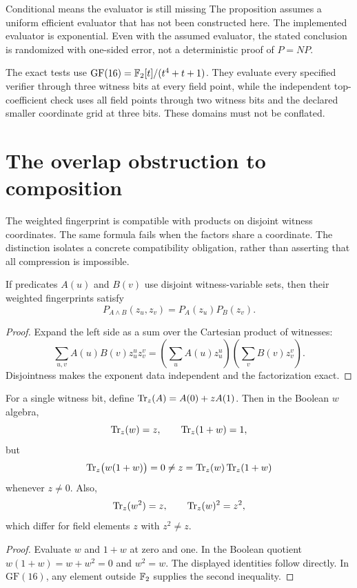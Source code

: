 \begin{circuitscopebox}{Conditional means the evaluator is still missing}
The proposition assumes a uniform efficient evaluator that has not been constructed here. The implemented evaluator is exponential. Even with the assumed evaluator, the stated conclusion is randomized with one-sided error, not a deterministic proof of $P=NP$.
\end{circuitscopebox}

The exact tests use $\mathrm{GF}(16)=\mathbb F_2[t]/(t^4+t+1)$. They evaluate every specified verifier through three witness bits at every field point, while the independent top-coefficient check uses all field points through two witness bits and the declared smaller coordinate grid at three bits. These domains must not be conflated.

\chapter{The overlap obstruction to composition}
\label{c:ch:overlap}
The weighted fingerprint is compatible with products on disjoint witness coordinates. The same formula fails when the factors share a coordinate. The distinction isolates a concrete compatibility obligation, rather than asserting that all compression is impossible.

\begin{proposition}\label{c:prop:disjoint}
If predicates $A(u)$ and $B(v)$ use disjoint witness-variable sets, then their weighted fingerprints satisfy
\[
 P_{A\land B}(z_u,z_v)=P_A(z_u)P_B(z_v).
\]
\end{proposition}
\begin{proof}
Expand the left side as a sum over the Cartesian product of witnesses:
\[
 \sum_{u,v}A(u)B(v)z_u^uz_v^v
 =\left(\sum_uA(u)z_u^u\right)
  \left(\sum_vB(v)z_v^v\right).
\]
Disjointness makes the exponent data independent and the factorization exact.
\end{proof}

\begin{counterexample}\label{c:ce:overlap}
For a single witness bit, define $\operatorname{Tr}_z(A)=A(0)+zA(1)$. Then in the Boolean $w$ algebra,
\[
 \operatorname{Tr}_z(w)=z,\qquad \operatorname{Tr}_z(1+w)=1,
\]
but
\[
 \operatorname{Tr}_z\bigl(w(1+w)\bigr)=0
 \ne z=\operatorname{Tr}_z(w)\operatorname{Tr}_z(1+w)
\]
whenever $z\ne0$. Also,
\[
 \operatorname{Tr}_z(w^2)=z,\qquad\operatorname{Tr}_z(w)^2=z^2,
\]
which differ for field elements $z$ with $z^2\ne z$.
\end{counterexample}
\begin{proof}
Evaluate $w$ and $1+w$ at zero and one. In the Boolean quotient $w(1+w)=w+w^2=0$ and $w^2=w$. The displayed identities follow directly. In $\mathrm{GF}(16)$, any element outside $\mathbb F_2$ supplies the second inequality.
\end{proof}

